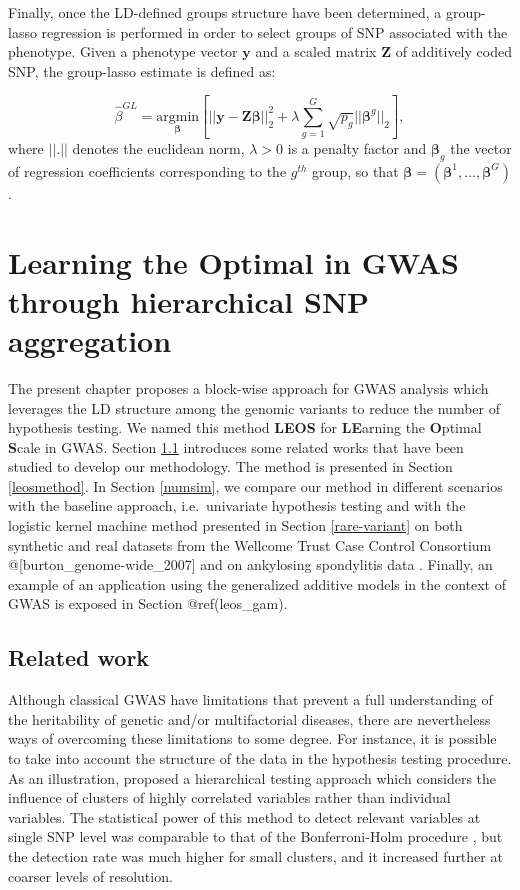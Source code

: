 \documentclass[]{book}
\begin{document}
Finally, once the LD-defined groups structure have been determined, a
group-lasso regression is performed in order to select groups of SNP
associated with the phenotype. Given a phenotype vector \(\mathbf{y}\) and a
scaled matrix \(\mathbf{Z}\) of additively coded SNP, the group-lasso estimate is
defined as:

\[\hat{\beta}^{GL} = \underset{\boldsymbol{\beta}}{\text{argmin}} \left[ ||\mathbf{y} - \mathbf{Z}\boldsymbol{\beta}||^2_2 + \lambda \sum_{g=1}^G \sqrt{p_g}||\boldsymbol{\beta}^g||_2  \right],\]
where \(||.||\) denotes the euclidean norm, \(\lambda > 0\) is a penalty
factor and \(\boldsymbol{\beta}_g\) the vector of regression coefficients
corresponding to the \(g^{th}\) group, so that
\(\boldsymbol{\beta} = (\boldsymbol{\beta}^1,\dots,\boldsymbol{\beta}^G)\).

\hypertarget{LEOS}{%
\chapter{Learning the Optimal in GWAS through hierarchical SNP aggregation}\label{LEOS}}

The present chapter proposes a block-wise approach for GWAS analysis which leverages the LD structure among the genomic variants to reduce the number of hypothesis testing. We named this method \textbf{LEOS} for \textbf{LE}arning the \textbf{O}ptimal \textbf{S}cale in GWAS. Section \ref{introleos} introduces some related works that have been studied to develop our methodology. The method is presented in Section \ref{leosmethod}. In Section \ref{numsim}, we compare our method in different scenarios with the baseline approach, i.e.~univariate hypothesis testing \citep{purcell_2007_plink} and with the logistic kernel machine method presented in Section \ref{rare-variant} on both synthetic and real datasets from the Wellcome Trust Case Control Consortium @{[}burton\_genome-wide\_2007{]} and on ankylosing spondylitis data \citep{IGAS_2013_identification}. Finally, an example of an application using the generalized additive models in the context of GWAS is exposed in Section @ref(leos\_gam).

\hypertarget{introleos}{%
\section{Related work}\label{introleos}}

Although classical GWAS have limitations that prevent a full
understanding of the heritability of genetic and/or multifactorial
diseases, there are nevertheless ways of overcoming these limitations to
some degree. For instance, it is possible to take into account the
structure of the data in the hypothesis testing procedure. As an
illustration, \citep{meinshausen_hierarchical_2008} proposed a hierarchical
testing approach which considers the influence of clusters of highly
correlated variables rather than individual variables. The statistical
power of this method to detect relevant variables at single SNP level
was comparable to that of the Bonferroni-Holm procedure
\citep{Holm_Bonferroni}, but the detection rate was much higher for small
clusters, and it increased further at coarser levels of resolution.
\end{document}
